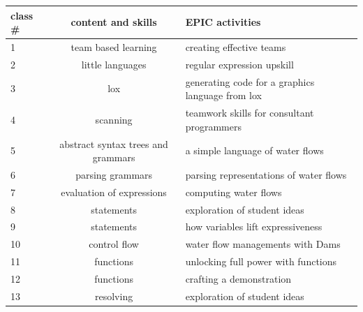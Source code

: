 \documentclass[twoside=false,DIV=14]{scrartcl}
\begin{document}
\begin{tabular}{lcl}
\textbf{class \#} & \textbf{content and skills} & \textbf{EPIC activities} \\
\hline
1 & team based learning  & creating effective teams\\
2 & little languages & regular expression upskill \\
3 & lox & generating code for a graphics language from lox \\
4 & scanning & teamwork skills for consultant programmers \\
5 & abstract syntax trees and grammars & a simple language of water flows\\
6 & parsing grammars & parsing representations of water flows \\
7 & evaluation of expressions & computing water flows \\
8 & statements & exploration of student ideas \\
9 & statements & how variables lift expressiveness\\
10 & control flow & water flow managements with Dams \\
11 & functions & unlocking full power with functions \\
12 & functions & crafting a demonstration \\
13 & resolving & exploration of student ideas \\
\hline
\end{tabular}
\end{document}
